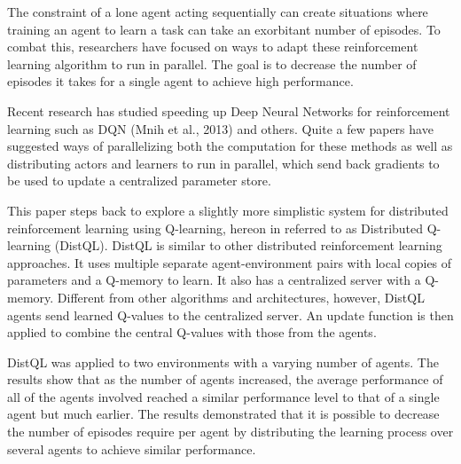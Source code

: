 \documentclass[jair,twoside,11pt,theapa]{article}
\begin{document}
The constraint of a lone agent acting sequentially can create situations where training an agent to learn a task can take an exorbitant number of episodes. 
To combat this, researchers have focused on ways to adapt these reinforcement learning algorithm to run in parallel. The goal is to decrease the number of episodes it takes for a single agent to achieve high performance.

Recent research has studied speeding up Deep Neural Networks for reinforcement learning such as DQN (Mnih et al., 2013)\nocite{Mnih2013} and others. Quite a few papers have suggested ways of parallelizing both the computation for these methods as well as distributing actors and learners to run in parallel, which send back gradients to be used to update a centralized parameter store. 

This paper steps back to explore a slightly more simplistic system for distributed reinforcement learning using Q-learning, hereon in referred to as Distributed Q-learning (DistQL). DistQL is similar to other distributed reinforcement learning approaches. It uses multiple separate agent-environment pairs with local copies of parameters and a Q-memory to learn. It also has a centralized server with a Q-memory. Different from other algorithms and architectures, however, DistQL agents send learned Q-values to the centralized server. An update function is then applied to combine the central Q-values with those from the agents. 

DistQL was applied to two environments with a varying number of agents. The results show that as the number of agents increased, the average performance of all of the agents involved reached a similar performance level to that of a single agent but much earlier. The results demonstrated that it is possible to decrease the number of episodes require per agent by distributing the learning process over several agents to achieve similar performance.  

\end{document}
